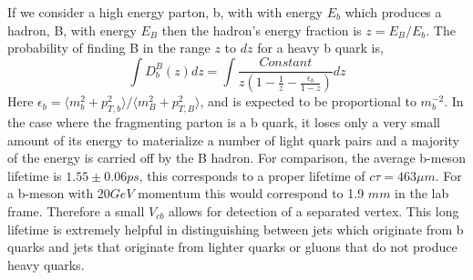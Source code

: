 If we consider a high energy parton, b, with with energy $E_{b}$ which produces a hadron, B, with energy $E_{B}$
then the hadron's energy fraction is $z=E_{B}/E_{b}$. The probability of finding B in the range
$z$ to $dz$ for a heavy b quark is,
\begin{equation}
\int{D_{b}^{B}(z)dz}=\int{\frac{Constant}{z(1-\frac{1}{z}-\frac{\epsilon_{b}}{1-z})}dz}
\end{equation}
Here $\epsilon_{b}=\langle m_{b}^{2}+ p_{T,b}^{2} \rangle/\langle m_{B}^{2}+ p_{T,B}^{2} \rangle$, and is expected to be proportional to $m_{b}^{-2}$.
In the case where the fragmenting parton is a b quark, it loses only a very small amount
of its energy to materialize a number of light quark pairs and a majority of the energy is
carried off by the B hadron.  
For comparison, the average b-meson lifetime is $1.55\pm 0.06 ps$, this corresponds to a proper lifetime of
$c\tau=463\mu m$. For a b-meson with 20$GeV$ momentum this would correspond to
1.9 $mm$ in the lab frame. Therefore a small $V_{cb}$ allows for detection of a separated vertex. 
This long lifetime is extremely helpful in distinguishing between jets which
originate from b quarks and jets that originate from lighter quarks 
or gluons that do not produce heavy quarks. 

